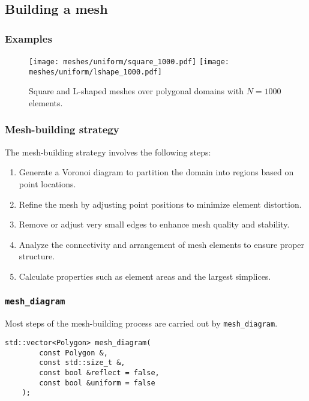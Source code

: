 \subsection{Building a mesh}

\begin{frame}
    \frametitle{Examples}

    \begin{figure}[!ht]
        \centering
        \texttt{[image: meshes/uniform/square\_1000.pdf]}
        \texttt{[image: meshes/uniform/lshape\_1000.pdf]}
        \caption{Square and L-shaped meshes over polygonal domains with $N = 1000$ elements.}
    \end{figure}
\end{frame}

\begin{frame}
    \frametitle{Mesh-building strategy}

    The mesh-building strategy involves the following steps:

    \begin{enumerate}
        \item Generate a Voronoi diagram to partition the domain into regions based on point locations.
        \item Refine the mesh by adjusting point positions to minimize element distortion.
        \item Remove or adjust very small edges to enhance mesh quality and stability.
        \item Analyze the connectivity and arrangement of mesh elements to ensure proper structure.
        \item Calculate properties such as element areas and the largest simplices.
    \end{enumerate}

\end{frame}

\begin{frame}[fragile]
    \frametitle{\lstinline{mesh_diagram}}

    Most steps of the mesh-building process are carried out by \lstinline{mesh_diagram}.

    \begin{lstlisting}[style=cpp]
    std::vector<Polygon> mesh_diagram(
        const Polygon &, 
        const std::size_t &, 
        const bool &reflect = false, 
        const bool &uniform = false
    );
    \end{lstlisting}

\end{frame}